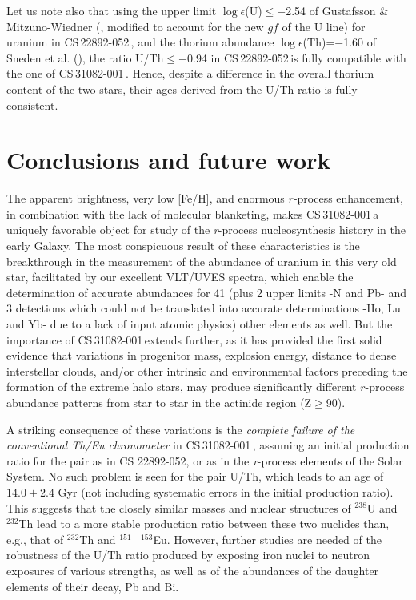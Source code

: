 \documentclass{aa}
\def\cs{CS\,31082-001\,}
\def\sned{CS\,22892-052\,}
\begin{document}
Let us note also that using the upper limit $\log \epsilon$(U)$\leq -$2.54 of Gustafsson \& Mitzuno-Wiedner 
(\cite{gustafsson01}, modified to account for the new $gf$ of the U line) 
for uranium in \sned, and the thorium abundance 
$\log \epsilon$(Th)=$-$1.60 of Sneden et al. (\cite{sneden00}), 
the ratio U/Th$\leq -$0.94 in \sned is fully compatible with the one of \cs.
Hence, despite a difference in the overall thorium content of the two stars,
 their ages derived from the U/Th ratio is fully consistent.

\section{Conclusions and future work}\label{conclusion}

The apparent brightness, very low [Fe/H], and enormous $r$-process enhancement,
in combination with the lack of molecular blanketing, makes \cs a uniquely
favorable object for study of the {\it r}-process nucleosynthesis 
history in the early
Galaxy. The most conspicuous result of these characteristics is the
breakthrough in the measurement of the abundance of uranium in this very old
star, facilitated by our excellent VLT/UVES spectra, which enable the
determination of accurate abundances for 41 (plus 2 upper limits -N
and Pb- and 3 detections which could not be translated 
into accurate determinations
-Ho, Lu and Yb- due to a lack of input atomic physics) other elements as
well. But the importance of \cs extends further, as it has provided the first
solid evidence that variations in progenitor mass, explosion energy, distance
to dense interstellar clouds, and/or other intrinsic and environmental factors
preceding the formation of the extreme halo stars, may produce significantly
different $r$-process abundance patterns from star to star in the actinide
region (Z$\geq$90).  

A striking consequence of these variations is the {\it complete failure 
of the conventional Th/Eu chronometer} in \cs, assuming an
initial production ratio for the pair as in CS 22892-052, or as in the {\it
r}-process elements of the Solar System. No such problem is seen for the pair
U/Th, which leads to an age of $14.0\pm 2.4$ Gyr (not including systematic
errors in the initial production ratio). This suggests that the closely similar
masses and nuclear structures of $^{238}$U and $^{232}$Th lead to a more stable
production ratio between these two nuclides than, e.g., that of $^{232}$Th and
$^{151-153}$Eu. However, further studies are needed of the robustness of the U/Th
ratio produced by exposing iron nuclei to neutron exposures of various
strengths, as well as of the abundances of the daughter elements of their
decay, Pb and Bi.
\end{document}
